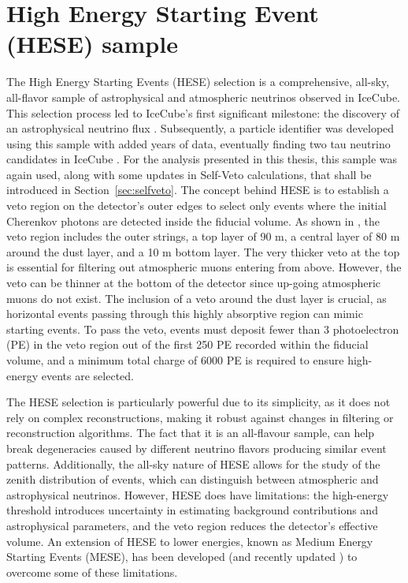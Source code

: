 \section{High Energy Starting Event (HESE) sample} 
\label{sec:HESE}
The High Energy Starting Events (HESE) selection is a comprehensive, all-sky, all-flavor sample of astrophysical and atmospheric neutrinos observed in IceCube. This selection process led to IceCube's first significant milestone: the discovery of an astrophysical neutrino flux . Subsequently, a particle identifier was developed using this sample with added years of data, eventually finding two tau neutrino candidates in IceCube . For the analysis presented in this thesis, this sample was again used, along with some updates in Self-Veto calculations, that shall be introduced in Section~\ref{sec:selfveto}. The concept behind HESE is to establish a veto region on the detector's outer edges to select only events where the initial Cherenkov photons are detected inside the fiducial volume. As shown in , the veto region includes the outer strings, a top layer of 90 m, a central layer of 80 m around the dust layer, and a 10 m bottom layer. The very thicker veto at the top is essential for filtering out atmospheric muons entering from above. However, the veto can be thinner at the bottom of the detector since up-going atmospheric muons do not exist. The inclusion of a veto around the dust layer is crucial, as horizontal events passing through this highly absorptive region can mimic starting events. To pass the veto, events must deposit fewer than 3 photoelectron (PE) in the veto region out of the first 250 PE recorded within the fiducial volume, and a minimum total charge of 6000 PE is required to ensure high-energy events are selected.

The HESE selection is particularly powerful due to its simplicity, as it does not rely on complex reconstructions, making it robust against changes in filtering or reconstruction algorithms. The fact that it is an all-flavour sample, can help break degeneracies caused by different neutrino flavors producing similar event patterns. Additionally, the all-sky nature of HESE allows for the study of the zenith distribution of events, which can distinguish between atmospheric and astrophysical neutrinos. However, HESE does have limitations: the high-energy threshold introduces uncertainty in estimating background contributions and astrophysical parameters, and the veto region reduces the detector's effective volume. An extension of HESE to lower energies, known as Medium Energy Starting Events (MESE), has been developed  (and recently updated ) to overcome some of these limitations.

